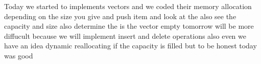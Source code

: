 Today we started to implements vectors and we coded their 
memory allocation depending on the size you give and push item 
and look at the also see the capacity and size also determine
the is the vector empty tomorrow will be more diffucult because
we will implement insert and delete operations also even we 
have an idea dynamic reallocating if the capacity is filled 
but to be honest today was good

